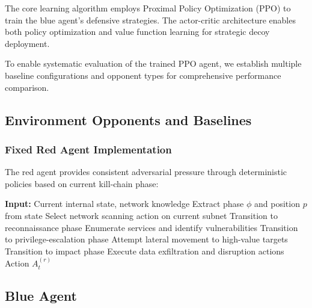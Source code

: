 \documentclass[12pt,oneside]{article}
\begin{document}
The core learning algorithm employs Proximal Policy Optimization (PPO) to train the blue agent's defensive strategies. The actor-critic architecture enables both policy optimization and value function learning for strategic decoy deployment.

To enable systematic evaluation of the trained PPO agent, we establish multiple baseline configurations and opponent types for comprehensive performance comparison.

\subsection{Environment Opponents and Baselines}

\subsubsection{Fixed Red Agent Implementation}
The red agent provides consistent adversarial pressure through deterministic policies based on current kill-chain phase:

\begin{algorithm}
\caption{Deterministic Red Agent Policy}
\begin{algorithmic}[1]
\STATE \textbf{Input:} Current internal state, network knowledge
\STATE Extract phase $\phi$ and position $p$ from state
    \STATE Select network scanning action on current subnet
        \STATE Transition to reconnaissance phase
    \ENDIF
{}
    \STATE Enumerate services and identify vulnerabilities
        \STATE Transition to privilege-escalation phase
    \ENDIF
{}
    \STATE Attempt lateral movement to high-value targets
        \STATE Transition to impact phase
    \ENDIF
{}
    \STATE Execute data exfiltration and disruption actions
\ENDIF
\RETURN Action $A_t^{(r)}$
\end{algorithmic}
\end{algorithm}


\subsection{Blue Agent}
\end{document}
